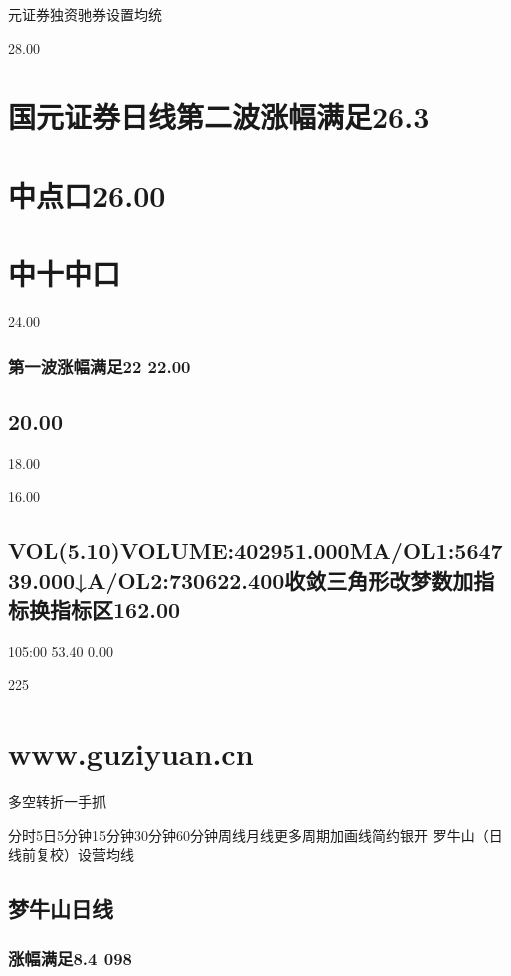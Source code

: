 \documentclass{article}
\begin{document}
元证券独资驰券设置均统

28.00

\section{国元证券日线第二波涨幅满足26.3}

\section{中点口26.00}

\section{中十中口}

24.00

\subsubsection{第一波涨幅满足22 22.00}

\subsection{20.00}

18.00

16.00

\subsection{VOL(5.10)VOLUME:402951.000MA/OL1:564739.000↓A/OL2:730622.400收敛三角形改梦数加指标换指标区162.00}

105:00 53.40 0.00

225

\clearpage

\section{www.guziyuan.cn}

多空转折一手抓

分时5日5分钟15分钟30分钟60分钟周线月线更多周期加画线简约银开 罗牛山（日线前复校）设营均线

\subsection{梦牛山日线}

\subsubsection{涨幅满足8.4 098}
\end{document}
